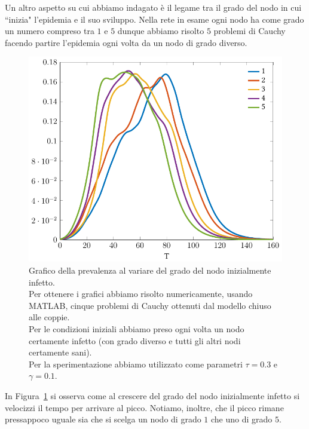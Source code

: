 Un altro aspetto su cui abbiamo indagato \`e il legame tra il grado del nodo in cui ``inizia" l'epidemia e il suo sviluppo.
Nella rete in esame ogni nodo ha come grado un numero compreso tra $1$ e $5$ dunque abbiamo risolto $5$ problemi di Cauchy facendo partire l'epidemia ogni volta da un nodo di grado diverso. 
\begin{figure}[htbp]
\centering
%
\includegraphics{Figure/minnesota_prevalenza}
\caption[Grafico della prevalenza al variare del grado del nodo inizialmente infetto.]{Grafico della prevalenza al variare del grado del nodo inizialmente infetto.\\ Per ottenere i grafici abbiamo risolto numericamente, usando MATLAB, cinque problemi di Cauchy ottenuti dal modello chiuso alle coppie.\\
Per le condizioni iniziali abbiamo preso ogni volta un nodo certamente infetto (con grado diverso e tutti gli altri nodi certamente sani).\\
Per la sperimentazione abbiamo utilizzato come parametri $\tau=0.3$ e $\gamma=0.1$.}
\label{fig::minnesota_prevalenza}
\end{figure}
In Figura~\ref{fig::minnesota_prevalenza} si osserva come al crescere del grado del nodo inizialmente infetto si velocizzi il tempo per arrivare al picco. Notiamo, inoltre, che il picco rimane pressappoco uguale sia che si scelga un nodo di grado $1$ che uno di grado $5$.

